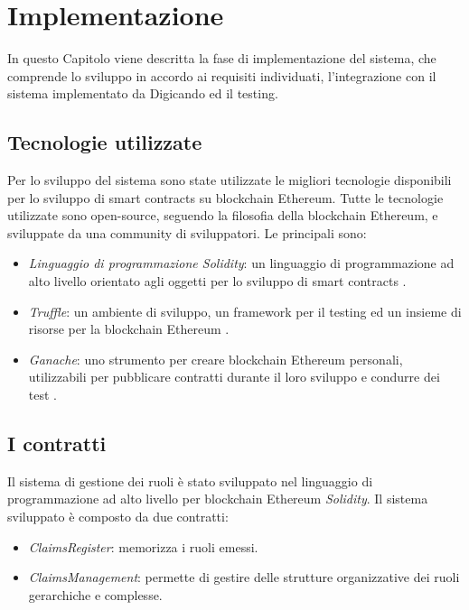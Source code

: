 \chapter{Implementazione}
\label{cha:implementazione}
In questo Capitolo viene descritta la fase di implementazione del sistema, che comprende lo sviluppo in accordo ai requisiti individuati, l'integrazione con il sistema implementato da Digicando ed il testing.

\section{Tecnologie utilizzate}
Per lo sviluppo del sistema sono state utilizzate le migliori tecnologie disponibili per lo sviluppo di smart contracts su blockchain Ethereum. Tutte le tecnologie utilizzate sono open-source, seguendo la filosofia della blockchain Ethereum, e sviluppate da una community di sviluppatori. Le principali sono:
\begin{itemize}
    \item \emph{Linguaggio di programmazione Solidity}: un linguaggio di programmazione ad alto livello orientato agli oggetti per lo sviluppo di smart contracts \cite{solidity-documentation}.
    \item \emph{Truffle}: un ambiente di sviluppo, un framework per il testing ed un insieme di risorse per la blockchain Ethereum \cite{trufflesuite}.
    \item \emph{Ganache}: uno strumento per creare blockchain Ethereum personali, utilizzabili per pubblicare contratti durante il loro sviluppo e condurre dei test \cite{trufflesuite}.
\end{itemize}

\section{I contratti}
\label{sec:contratti}
Il sistema di gestione dei ruoli è stato sviluppato nel linguaggio di programmazione ad alto livello per blockchain Ethereum \emph{Solidity}. Il sistema sviluppato è composto da due contratti:
\begin{itemize}
    \item \emph{ClaimsRegister}: memorizza i ruoli emessi.
    \item \emph{ClaimsManagement}: permette di gestire delle strutture organizzative dei ruoli gerarchiche e complesse.
\end{itemize}

